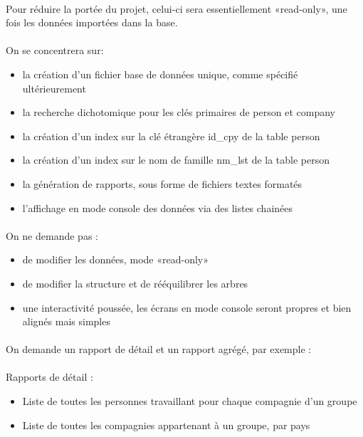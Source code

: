 \documentclass{article}
\begin{document}
    \paragraph{}
    Pour réduire la portée du projet, celui-ci sera essentiellement «read-only», une fois les données importées
dans la base.

    \paragraph{}
    On se concentrera sur:
    \begin{itemize}[label=$\bullet$]
        \item la création d’un fichier base de données unique, comme spécifié ultérieurement
        \item la recherche dichotomique pour les clés primaires de person et company
        \item la création d’un index sur la clé étrangère id\_cpy de la table person
        \item la création d’un index sur le nom de famille nm\_lst de la table person
        \item la génération de rapports, sous forme de fichiers textes formatés
        \item l’affichage en mode console des données via des listes chainées
    \end{itemize}

    \paragraph{}
    On ne demande pas :
    \begin{itemize}[label=$\bullet$]
        \item de modifier les données, mode «read-only»
        \item de modifier la structure et de rééquilibrer les arbres
        \item une interactivité poussée, les écrans en mode console seront propres et bien alignés mais simples
    \end{itemize}

    \paragraph{}
    On demande un rapport de détail et un rapport agrégé, par exemple :

    \paragraph{}
    Rapports de détail :
    \begin{itemize}[label=$\bullet$]
        \item Liste de toutes les personnes travaillant pour chaque compagnie d’un groupe
        \item Liste de toutes les compagnies appartenant à un groupe, par pays
    \end{itemize}
\end{document}
